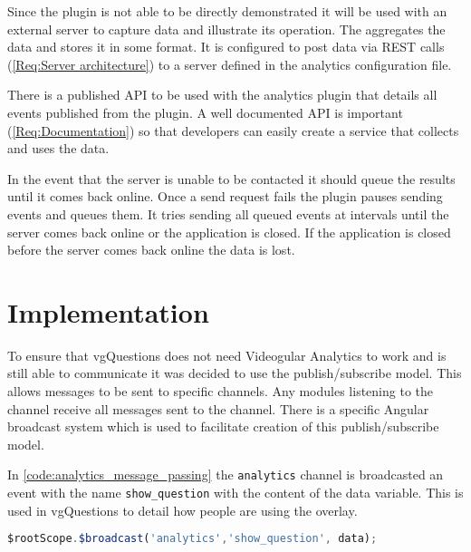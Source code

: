 Since the plugin is not able to be directly demonstrated it will be used with an external server to capture data and illustrate its operation. The aggregates the data and stores it in some format. It is configured to post data via \gls{REST} calls (\cref{Req:Server architecture}) to a server defined in the analytics configuration file.

There is a published \gls{API} to be used with the analytics plugin that details all events published from the plugin. A well documented API is important (\cref{Req:Documentation}) so that developers can easily create a service that collects and uses the data.

In the event that the server is unable to be contacted it should queue the results until it comes back online. Once a send request fails the plugin pauses sending events and queues them. It tries sending all queued events at intervals until the server comes back online or the application is closed. If the application is closed before the server comes back online the data is lost.

\section{Implementation}

To ensure that \gls{vgQuestions} does not need \gls{Videogular} Analytics to work and is still able to communicate it was decided to use the publish/subscribe model. This allows messages to be sent to specific channels. Any modules listening to the channel receive all messages sent to the channel. There is a specific Angular broadcast system which is used to facilitate creation of this publish/subscribe model.

In \autoref{code:analytics_message_passing} the \lstinline|analytics| channel is broadcasted an event with the name
\lstinline|show_question| with the content of the data variable. This is used in \gls{vgQuestions} to detail how people are using the overlay.

\begin{lstlisting}[language=javascript,caption={AngularJS demonstrating the message passing interface used in the Analytics plugin},label={code:analytics_message_passing}]
$rootScope.$broadcast('analytics','show_question', data);
\end{lstlisting}

